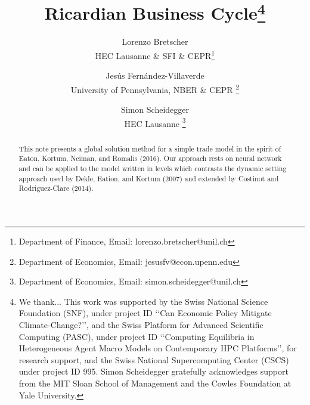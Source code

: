 \documentclass[12pt, bibtotoc, tablecaptionabove, figurecaptionabove, fleqn]{article}
\renewcommand{\baselinestretch}{1.5}
\begin{document}
\thispagestyle{empty}

\renewcommand{\baselinestretch}{1}
\renewcommand{\thefootnote}{\fnsymbol{footnote}}
\vspace{-1cm}
\title{\Huge{Ricardian Business Cycle\thanks{\noindent We thank... This work was supported by the Swiss National Science Foundation (SNF), under project ID  \lq\lq Can Economic Policy Mitigate Climate-Change?\rq\rq, and the Swiss Platform for Advanced Scientific Computing (PASC), under project ID \lq\lq Computing Equilibria in Heterogeneous Agent Macro Models on Contemporary HPC Platforms\rq\rq, for research support, and the Swiss National Supercomputing Center (CSCS) under project ID 995. Simon Scheidegger gratefully acknowledges support from the MIT Sloan School of Management and the Cowles Foundation at Yale University.}\\
}}

\author{
{Lorenzo Bretscher}\\
{HEC Lausanne \& SFI \& CEPR\footnote{Department of Finance, Email: lorenzo.bretscher@unil.ch}} \and {Jes\'{u}s Fern\'{a}ndez-Villaverde}\\ {University of Pennsylvania, NBER \& CEPR \footnote{Department of Economics, Email: jesusfv@econ.upenn.edu}}\and {Simon Scheidegger} \\{HEC Lausanne \footnote{Department of Economics, Email: simon.scheidegger@unil.ch}}}


\maketitle                   %
\vspace{-1cm}


\setlength{\baselineskip}{.3in} \thispagestyle{empty} %


\begin{abstract}
This note presents a global solution method for a simple trade model in the spirit of Eaton, Kortum, Neiman, and Romalis (2016). Our approach rests on neural network and can be applied to the model written in levels which contrasts the dynamic setting approach used by Dekle, Eation, and Kortum (2007) and extended by Costinot and Rodriguez-Clare (2014).
\end{abstract}
\end{document}
